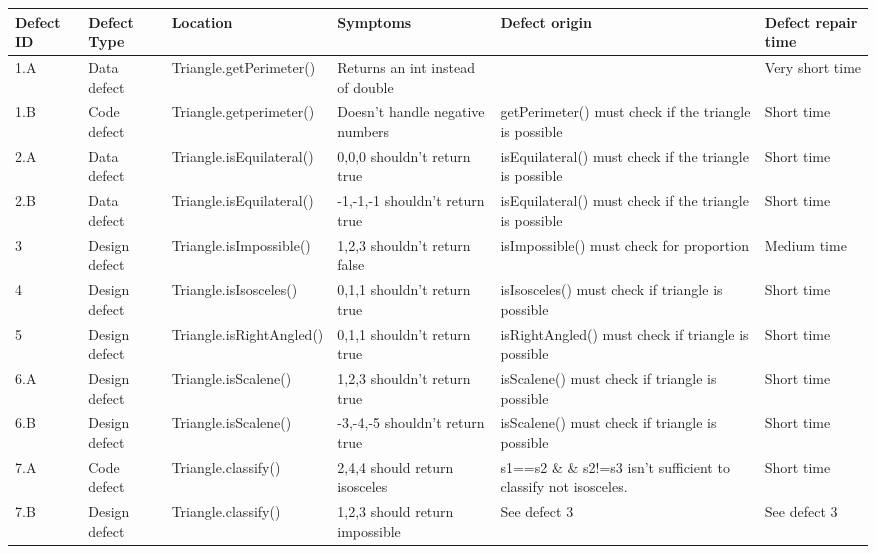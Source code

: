 \begin{table}
\begin{tabular}{|l|l|l|l|l|l|}
\hline  Defect ID & Defect Type   & Location  & Symptoms & Defect origin  & Defect repair time \\ \hline
1.A       & Data defect   & Triangle.getPerimeter()  & Returns an int instead of double & ~																													 & Very short time\\
1.B       & Code defect   & Triangle.getperimeter()  & Doesn't handle negative numbers  & getPerimeter() must check if the triangle is possible & Short time         \\         2.A       & Data defect   & Triangle.isEquilateral() & 0,0,0 shouldn't return true      & isEquilateral() must check if the triangle is possible       & Short time         \\    2.B       & Data defect   & Triangle.isEquilateral() & -1,-1,-1 shouldn't return true   & isEquilateral() must check if the triangle is possible       & Short time         \\    3         & Design defect & Triangle.isImpossible()  & 1,2,3 shouldn't return false     & isImpossible() must check for proportion                     & Medium time        \\    4         & Design defect & Triangle.isIsosceles()   & 0,1,1 shouldn't return true      & isIsosceles() must check if triangle is possible             & Short time         \\    5         & Design defect & Triangle.isRightAngled() & 0,1,1 shouldn't return true      & isRightAngled() must check if triangle is possible           & Short time         \\    6.A       & Design defect & Triangle.isScalene()     & 1,2,3 shouldn't return true      & isScalene() must check if triangle is possible               & Short time         \\    6.B       & Design defect & Triangle.isScalene()     & -3,-4,-5 shouldn't return true   & isScalene() must check if triangle is possible               & Short time         \\    7.A       & Code defect   & Triangle.classify()      & 2,4,4 should return isosceles    & s1==s2 \& \& s2!=s3 isn't sufficient to classify not isosceles. & Short time         \\ 7.B       & Design defect & Triangle.classify()      & 1,2,3 should return impossible   & See defect 3                                                 & See defect 3       \\         \hline     
\end{tabular}
\end{table}